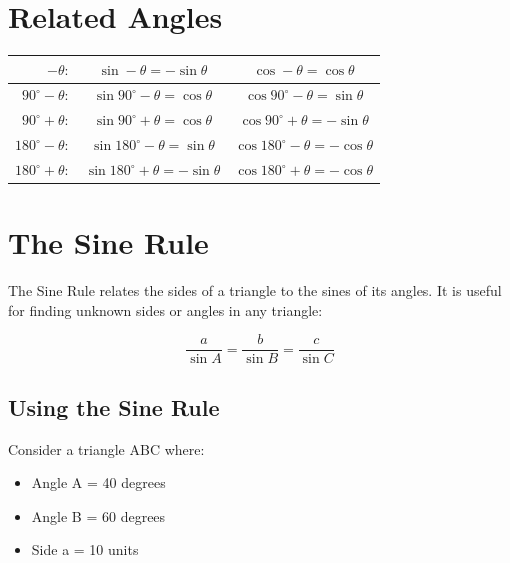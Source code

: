 \documentclass[12pt]{article}
\begin{document}
\section*{Related Angles}
\begin{center}
\begin{Large}
\renewcommand{\arraystretch}{1.5}
\begin{tabular}{r|c|c}
\hline
$-\theta:$ & $\sin-\theta=-\sin\theta$ & $\cos-\theta= \cos\theta$ \\
\hline
 $90^\circ-\theta:$ & $\sin90^\circ-\theta=\cos\theta$ & $\cos90^\circ-\theta=\sin\theta$ \\
$90^\circ+\theta:$ & $\sin90^\circ+\theta= \cos\theta$ & $\cos90^\circ+\theta=-\sin\theta$ \\
\hline
$180^\circ-\theta:$ & $\sin180^\circ-\theta= \sin\theta$ & $\cos180^\circ-\theta=-\cos\theta$ \\
$180^\circ+\theta:$ & $\sin180^\circ+\theta=-\sin\theta$ & $\cos180^\circ+\theta=-\cos\theta$ \\
\hline
\end{tabular}
\end{Large}
\end{center}

\newpage

\section*{The Sine Rule}
The Sine Rule relates the sides of a triangle to the sines of its angles. It is useful for finding unknown sides or angles in any triangle:

\[\frac{a}{\sin A} = \frac{b}{\sin B} = \frac{c}{\sin C}\]

\subsection*{Using the Sine Rule}

Consider a triangle ABC where:

\begin{itemize}
\item Angle A = 40 degrees
\item Angle B = 60 degrees
\item Side a = 10 units
\end{itemize}

\begin{center}
\end{center}
\end{document}
